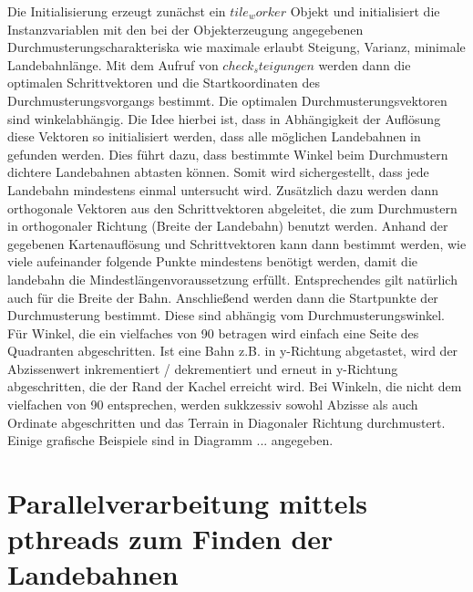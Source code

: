 \documentclass[10pt,a4paper]{report}
\begin{document}
Die Initialisierung erzeugt zunächst ein $tile_worker$ Objekt und initialisiert die Instanzvariablen mit den bei der Objekterzeugung angegebenen Durchmusterungscharakteriska wie maximale erlaubt Steigung, Varianz, minimale Landebahnlänge.
Mit dem Aufruf von $check_steigungen$ werden dann die optimalen Schrittvektoren und die Startkoordinaten des Durchmusterungsvorgangs bestimmt.
Die optimalen Durchmusterungsvektoren sind winkelabhängig. Die Idee hierbei ist, dass in Abhängigkeit der Auflösung diese Vektoren so initialisiert werden, dass alle möglichen Landebahnen in gefunden werden. Dies führt dazu, dass bestimmte Winkel beim Durchmustern dichtere Landebahnen abtasten können. Somit wird sichergestellt, dass jede Landebahn mindestens einmal untersucht wird.
Zusätzlich dazu werden dann orthogonale Vektoren aus den Schrittvektoren abgeleitet, die zum Durchmustern in orthogonaler Richtung (Breite der Landebahn) benutzt werden.
Anhand der gegebenen Kartenauflösung und Schrittvektoren kann dann bestimmt werden, wie viele aufeinander folgende Punkte mindestens benötigt werden, damit die landebahn die Mindestlängenvoraussetzung erfüllt.
Entsprechendes gilt natürlich auch für die Breite der Bahn.
Anschließend werden dann die Startpunkte der Durchmusterung bestimmt.
Diese sind abhängig vom Durchmusterungswinkel. 
Für Winkel, die ein vielfaches von 90 betragen wird einfach eine Seite des Quadranten abgeschritten. Ist eine Bahn z.B. in y-Richtung abgetastet, wird der Abzissenwert inkrementiert / dekrementiert und erneut in y-Richtung abgeschritten, die der Rand der Kachel erreicht wird.
Bei Winkeln, die nicht dem vielfachen von 90 entsprechen, werden sukkzessiv sowohl Abzisse als auch Ordinate abgeschritten und das Terrain in Diagonaler Richtung durchmustert. 
Einige grafische Beispiele sind in Diagramm ... angegeben.

\clearpage
\section{Parallelverarbeitung mittels pthreads zum Finden der Landebahnen}
\end{document}

